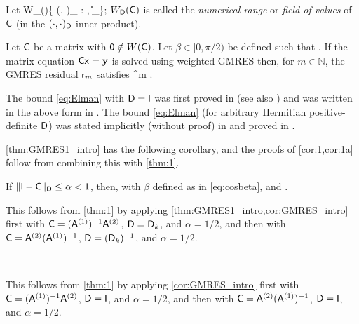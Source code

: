 Let 
\beq\label{eq:fov}
W_\Dmat(\matrixC)\de \Big\{ (\matrixC \xvec, \xvec)_{\Dmat} : \xvec \in \CCN, \|\xvec\|_\Big\};
\eeq
$W_{\mathsf{D}}(\mathsf{C})$ is called the \emph{numerical range} or \emph{field of values} of $\mathsf{C}$ (in the $(\cdot,\cdot)_{\mathsf{D}}$ inner product).


\begin{theorem}\label{thm:GMRES1_intro} 
Let $\mathsf{C}$ be a matrix with $\mathsf{0}\notin W(\mathsf{C})$. Let $\beta\in[0,\pi/2)$ be defined such that
\beq\label{eq:cosbeta}
\cos \beta \de {}.
\eeq
If the matrix equation $\mathsf{C} \mathsf{x} = \mathbf{y}$ is solved using weighted GMRES then, 
for $m\in \mathbb{N}$, the GMRES residual $\mathsf{r}_{m}$ %
satisfies
\beq\label{eq:Elman}
\frac{\N{\rvecm}_{\Dmat}}{\N{\rvecz}_{\Dmat}} \leq \sin^m \beta. %
\eeq
\end{theorem}
The bound \cref{eq:Elman} with $\mathsf{D}=\mathsf{I}$ was first proved in \cite[Theorem 6.3]{El:82} (see also \cite[Theorem 3.3]{EiElSc:83}) and was written in the above form in \cite[Equation 1.2]{BeGoTy:06}. The bound \cref{eq:Elman} (for arbitrary Hermitian positive-definite $\mathsf{D}$) was stated implicitly (without proof) in \cite[p. 247]{CaWi:92} and proved in \cite[Theorem 5.1]{GrSpVa:17}. %



\cref{thm:GMRES1_intro} has the following corollary, and the proofs of \cref{cor:1,cor:1a} follow from combining this with \cref{thm:1}.

\begin{corollary}
\label{cor:GMRES_intro} 
If $\|\mathsf{I} - \mathsf{C} \|_{\mathsf{D}} \leq \alpha < 1$, then, with $\beta$ defined as in \cref{eq:cosbeta},
\beqs
\cos \beta \geq {}\eeqs
and
\beq\label{eq:gmressin}
\sin \beta \leq {}.
\eeq
\end{corollary}

This follows from \cref{thm:1} by applying \cref{thm:GMRES1_intro,cor:GMRES_intro} first with $\mathsf{C}= (\mathsf{A}^{(1)})^{-1} \mathsf{A}^{(2)}$, $\mathsf{D}=\mathsf{D}_k$, and $\alpha=1/2$, and then with $\mathsf{C}= \mathsf{A}^{(2)}(\mathsf{A}^{(1)})^{-1} $, $\mathsf{D}=(\mathsf{D}_k)^{-1}$, and $\alpha=1/2$.
\epf

\

This follows from \cref{thm:1} by applying \cref{cor:GMRES_intro} first with $\mathsf{C}= (\mathsf{A}^{(1)})^{-1} \mathsf{A}^{(2)}$, $\mathsf{D}=\mathsf{I}$, and $\alpha=1/2$, and then with $\mathsf{C}= \mathsf{A}^{(2)}(\mathsf{A}^{(1)})^{-1} $, $\mathsf{D}=\mathsf{I}$, and $\alpha=1/2$.
\epf


